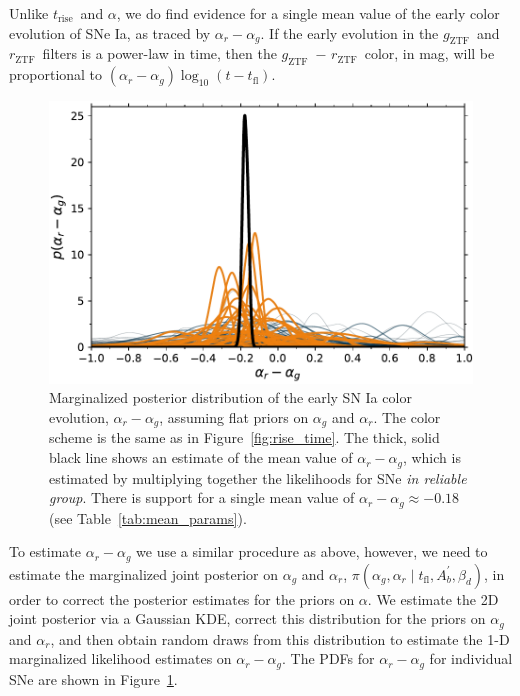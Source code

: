 \documentclass[twocolumn]{aastex63}
\newcommand{\rztf}{$r_\mathrm{ZTF}$}
\newcommand{\gztf}{$g_\mathrm{ZTF}$}
\newcommand{\trise}{$t_\mathrm{rise}$}
\begin{document}
Unlike \trise\ and $\alpha$, we do find evidence for a single mean value of
the early color evolution of SNe Ia, as traced by $\alpha_r - \alpha_g$. If
the early evolution in the \gztf\ and \rztf\ filters is a power-law in time,
then the \gztf\ $-$ \rztf\ color, in mag, will be proportional to $(\alpha_r -
\alpha_g) \log_{10} (t - t_\mathrm{fl})$.

\begin{figure}
    \centering
    \includegraphics[width=1\linewidth]{./figures/delta.pdf}
    \caption{Marginalized posterior distribution of the early SN Ia color
    evolution, $\alpha_r - \alpha_g$, assuming flat priors on $\alpha_g$ and
    $\alpha_r$. The color scheme is the same as in Figure~\ref{fig:rise_time}.
    The thick, solid black line shows an estimate of the mean value of
    $\alpha_r - \alpha_g$, which is estimated by multiplying together the
    likelihoods for SNe \textit{in reliable group}. There is support for a
    single mean value of $\alpha_r - \alpha_g \approx -0.18$ (see
    Table~\ref{tab:mean_params}).}
    \label{fig:delta}
\end{figure}

To estimate $\alpha_r - \alpha_g$ we use a similar procedure as above,
however, we need to estimate the marginalized joint posterior on $\alpha_g$
and $\alpha_r$, $\pi(\alpha_g,\alpha_r \mid t_\mathrm{fl}, A^\prime_b,
\beta_d)$, in order to correct the posterior estimates for the priors on
$\alpha$. We estimate the 2D joint posterior via a Gaussian KDE, correct this
distribution for the priors on $\alpha_g$ and $\alpha_r$, and then obtain
random draws from this distribution to estimate the 1-D marginalized
likelihood estimates on $\alpha_r - \alpha_g$. The PDFs for $\alpha_r -
\alpha_g$ for individual SNe are shown in Figure~\ref{fig:delta}.
\end{document}
